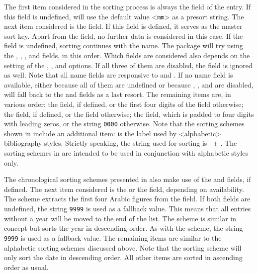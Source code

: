 \documentclass{ltxdockit}[2011/03/25]
\begin{document}
The first item considered in the sorting process is always the  field of the entry. If this field is undefined,  will use the default value <\texttt{mm}> as a presort string. The next item considered is the  field. If this field is defined, it serves as the master sort key. Apart from the  field, no further data is considered in this case. If the  field is undefined, sorting continues with the name. The package will try using the , , , and  fields, in this order. Which fields are considered also depends on the setting of the , , and  options. If all three of them are disabled, the  field is ignored as well. Note that all name fields are responsive to  and . If no name field is available, either because all of them are undefined or because , , and  are disabled,  will fall back to the  and  fields as a last resort. The remaining items are, in various order: the  field, if defined, or the first four digits of the  field otherwise; the  field, if defined, or the  field otherwise; the  field, which is padded to four digits with leading zeros, or the string \texttt{0000} otherwise. Note that the sorting schemes shown in  include an additional item:  is the label used by <alphabetic> bibliography styles. Strictly speaking, the string used for sorting is ~+ . The sorting schemes in  are intended to be used in conjunction with alphabetic styles only.

The chronological sorting schemes presented in  also make use of the  and  fields, if defined. The next item considered is the  or the  field, depending on availability. The  scheme extracts the first four Arabic figures from the field. If both fields are undefined, the string \texttt{9999} is used as a fallback value. This means that all entries without a year will be moved to the end of the list. The  scheme is similar in concept but sorts the year in descending order. As with the  scheme, the string \texttt{9999} is used as a fallback value. The remaining items are similar to the alphabetic sorting schemes discussed above. Note that the  sorting scheme will only sort the date in descending order. All other items are sorted in ascending order as usual.
\end{document}
